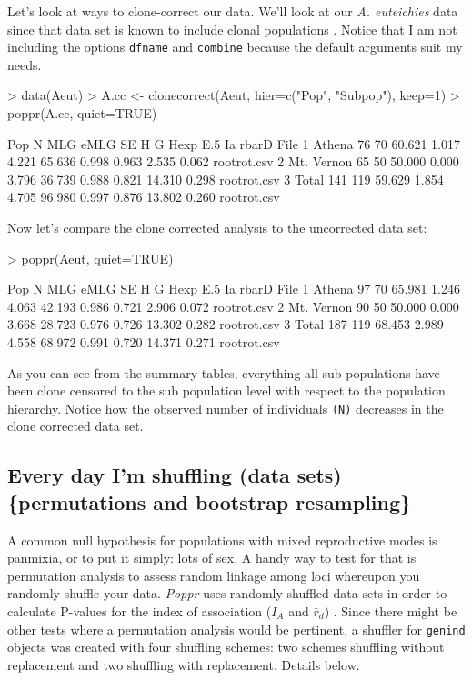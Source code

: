\documentclass[letterpaper]{article}
\newcommand{\tab}{\hspace*{1em}}
\begin{document}
Let's look at ways to clone-correct our data. We'll look at our \textit{A. euteichies} data since that data set is known to include clonal populations \cite{Grunwald:2006}. Notice that I am not including the options \texttt{dfname} and \texttt{combine} because the default arguments suit my needs.
\begin{Schunk}
\begin{Sinput}
> data(Aeut)
> A.cc <- clonecorrect(Aeut,  hier=c("Pop", "Subpop"), keep=1)
> poppr(A.cc, quiet=TRUE)
\end{Sinput}
\begin{Soutput}
         Pop   N MLG   eMLG    SE     H      G  Hexp   E.5     Ia rbarD        File
1     Athena  76  70 60.621 1.017 4.221 65.636 0.998 0.963  2.535 0.062 rootrot.csv
2 Mt. Vernon  65  50 50.000 0.000 3.796 36.739 0.988 0.821 14.310 0.298 rootrot.csv
3      Total 141 119 59.629 1.854 4.705 96.980 0.997 0.876 13.802 0.260 rootrot.csv
\end{Soutput}
\end{Schunk}
Now let's compare the clone corrected analysis to the uncorrected data set:
\begin{Schunk}
\begin{Sinput}
> poppr(Aeut, quiet=TRUE)
\end{Sinput}
\begin{Soutput}
         Pop   N MLG   eMLG    SE     H      G  Hexp   E.5     Ia rbarD        File
1     Athena  97  70 65.981 1.246 4.063 42.193 0.986 0.721  2.906 0.072 rootrot.csv
2 Mt. Vernon  90  50 50.000 0.000 3.668 28.723 0.976 0.726 13.302 0.282 rootrot.csv
3      Total 187 119 68.453 2.989 4.558 68.972 0.991 0.720 14.371 0.271 rootrot.csv
\end{Soutput}
\end{Schunk}

As you can see from the summary tables, everything all sub-populations have been clone censored to the sub population level with respect to the population hierarchy. Notice how the observed number of individuals \texttt{(N)} decreases in the clone corrected data set.

\subsection{Every day I'm shuffling (data sets)  \{permutations and bootstrap resampling\}}\label{data.manip:shuffle}

\tab\tab A common null hypothesis for populations with mixed reproductive modes is panmixia, or to put it simply: lots of sex. A handy way to test for that is permutation analysis to assess random linkage among loci whereupon you randomly shuffle your data. \textit{Poppr} uses randomly shuffled data sets in order to calculate P-values for the index of association ($I_A$ and $\bar r_d$) \cite{Agapow:2001}. Since there might be other tests where a permutation analysis would be pertinent, a shuffler for \texttt{genind} objects was created with four shuffling schemes: two schemes shuffling without replacement and two shuffling with replacement. Details below.
\end{document}
